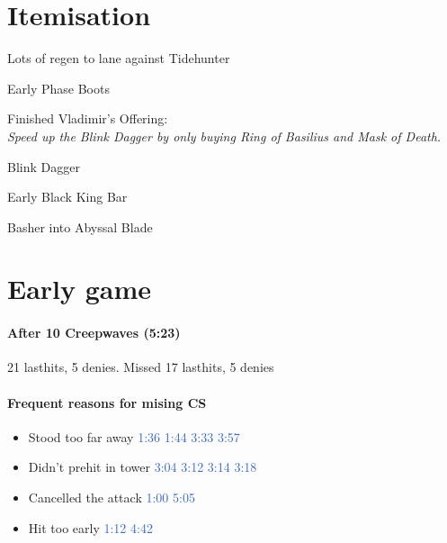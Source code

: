 \documentclass{article}
\newcommand{\gt}{\ensuremath{\;\;\color{green} \filledmedtriangleup} }
\newcommand{\rt}{\ensuremath{\;\;\color{red} \filledmedtriangledown} }
\newenvironment{remarks}
    {
        \begin{description}
            \setlength\itemsep{0em}
    }
    {
        \end{description}
    }
\newcommand{\goodremark}[1]{\item[\gt] #1}
\newcommand{\badremark}[1]{\item[\rt] #1}
\newcommand{\suggestion}[1]{\\ \emph{#1}}
\newcommand{\logref}[1]{\textcolor{highlight}{#1}}
\begin{document}
\pagebreak

\section{Itemisation}

\begin{remarks}
\goodremark{Lots of regen to lane against Tidehunter}
\goodremark{ Early Phase Boots}
\badremark{Finished Vladimir's Offering:
    \suggestion{Speed up the Blink Dagger by only buying Ring of Basilius and Mask of Death.} }
\goodremark{Blink Dagger}
\goodremark{Early Black King Bar}
\goodremark{Basher into Abyssal Blade}
\end{remarks}


\section{Early game}

\paragraph{After 10 Creepwaves (5:23)}
21 lasthits, 5 denies. Missed 17 lasthits, 5 denies

\paragraph{Frequent reasons for mising CS}
\begin{itemize}
    \item Stood too far away \logref{1:36} \logref{1:44} \logref{3:33} \logref{3:57}
    \item Didn't prehit in tower \logref{3:04} \logref{3:12} \logref{3:14} \logref{3:18}
    \item Cancelled the attack \logref{1:00} \logref{5:05}
    \item Hit too early \logref{1:12} \logref{4:42}
\end{itemize}
\end{document}
